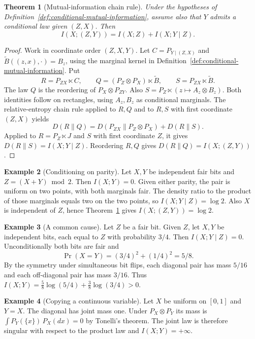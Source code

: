 \documentclass[11pt,oneside]{book}
\newtheorem{theorem}{Theorem}[chapter]
\theoremstyle{definition}
\newtheorem{example}[theorem]{Example}
\theoremstyle{remark}
\begin{document}
\begin{theorem}[Mutual-information chain rule]
\label{thm:mutual-information-chain-rule}
Under the hypotheses of Definition~\ref{def:conditional-mutual-information},
assume also that $Y$ admits a conditional law given $(Z,X)$. Then
\[
I(X;(Z,Y))=I(X;Z)+I(X;Y\mid Z).
\]
\end{theorem}
\begin{proof}
Work in coordinate order $(Z,X,Y)$. Let $C=P_{Y\mid(Z,X)}$
and $\widetilde B((z,x),\cdot)=B_z$, using the marginal kernel
in Definition~\ref{def:conditional-mutual-information}. Put
\[
R=P_{ZX}\ltimes C,\qquad
Q=(P_Z\otimes P_X)\ltimes\widetilde B,\qquad
S=P_{ZX}\ltimes\widetilde B .
\]
The law $Q$ is the reordering of $P_X\otimes P_{ZY}$.
Also $S=P_Z\ltimes (z\mapsto A_z\otimes B_z)$.
Both identities follow on rectangles, using $A_z,B_z$ as conditional
marginals. The relative-entropy chain rule applied to $R,Q$ and
to $R,S$ with first coordinate $(Z,X)$ yields
\[
D(R\|Q)=D(P_{ZX}\|P_Z\otimes P_X)+D(R\|S).
\]
Applied to $R=P_Z\ltimes J$ and $S$ with first coordinate $Z$,
it gives $D(R\|S)=I(X;Y\mid Z)$. Reordering $R,Q$ gives
$D(R\|Q)=I(X;(Z,Y))$.
\end{proof}

\begin{example}[Conditioning on parity]
\label{ex:mutual-information-parity}
Let $X,Y$ be independent fair bits and $Z=(X+Y)\bmod 2$.
Then $I(X;Y)=0$. Given either parity, the pair is uniform on two
points, with both marginals fair. The density ratio to the product
of those marginals equals two on the two points, so
$I(X;Y\mid Z)=\log 2$. Also $X$ is independent of $Z$, hence
Theorem~\ref{thm:mutual-information-chain-rule} gives
$I(X;(Z,Y))=\log 2$.
\end{example}

\begin{example}[A common cause]
\label{ex:mutual-information-common-cause}
Let $Z$ be a fair bit. Given $Z$, let $X,Y$ be independent bits,
each equal to $Z$ with probability $3/4$. Then $I(X;Y\mid Z)=0$.
Unconditionally both bits are fair and
\[
\Pr(X=Y)=(3/4)^2+(1/4)^2=5/8 .
\]
By the symmetry under simultaneous bit flips, each diagonal
pair has mass $5/16$ and each off-diagonal pair has mass $3/16$.
Thus $I(X;Y)=\tfrac58\log(5/4)+\tfrac38\log(3/4)>0$.
\end{example}

\begin{example}[Copying a continuous variable]
\label{ex:mutual-information-continuous-copy}
Let $X$ be uniform on $[0,1]$ and $Y=X$. The diagonal has joint
mass one. Under $P_X\otimes P_Y$ its mass is
$\int P_Y(\{x\})\,P_X(dx)=0$ by Tonelli's theorem. The joint law
is therefore singular with respect to the product law and
$I(X;Y)=+\infty$.
\end{example}
\end{document}
